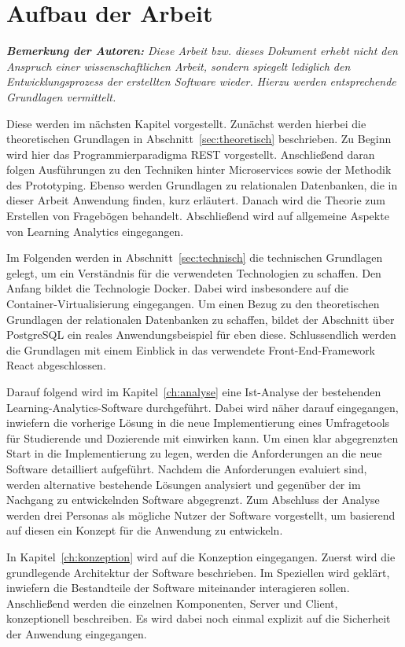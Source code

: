 \section{Aufbau der Arbeit}

\textit{\textbf{Bemerkung der Autoren:}
Diese Arbeit bzw. dieses Dokument erhebt nicht den Anspruch einer wissenschaftlichen Arbeit, sondern spiegelt lediglich den Entwicklungsprozess der erstellten Software wieder.
Hierzu werden entsprechende Grundlagen vermittelt.}

Diese werden im nächsten Kapitel vorgestellt.
Zunächst werden hierbei die theoretischen Grundlagen in Abschnitt~\vref{sec:theoretisch} beschrieben.
Zu Beginn wird hier das Programmierparadigma \acs{REST} vorgestellt.
Anschließend daran folgen Ausführungen zu den Techniken hinter Microservices sowie der Methodik des Prototyping.
Ebenso werden Grundlagen zu relationalen Datenbanken, die in dieser Arbeit Anwendung finden, kurz erläutert.
Danach wird die Theorie zum Erstellen von Fragebögen behandelt.
Abschließend wird auf allgemeine Aspekte von Learning Analytics eingegangen.

Im Folgenden werden in Abschnitt~\vref{sec:technisch} die technischen Grundlagen gelegt, um ein Verständnis für die verwendeten Technologien zu schaffen.
Den Anfang bildet die Technologie Docker.
Dabei wird insbesondere auf die Container-Virtualisierung eingegangen.
Um einen Bezug zu den theoretischen Grundlagen der relationalen Datenbanken zu schaffen, bildet der Abschnitt über PostgreSQL ein reales Anwendungsbeispiel für eben diese.
Schlussendlich werden die Grundlagen mit einem Einblick in das verwendete Front-End-Framework React abgeschlossen.

Darauf folgend wird im Kapitel~\vref{ch:analyse} eine Ist-Analyse der bestehenden Learning-Analytics-Software durchgeführt.
Dabei wird näher darauf eingegangen, inwiefern die vorherige Lösung in die neue Implementierung eines Umfragetools für Studierende und Dozierende mit einwirken kann.
Um einen klar abgegrenzten Start in die Implementierung zu legen, werden die Anforderungen an die neue Software detailliert aufgeführt.
Nachdem die Anforderungen evaluiert sind, werden alternative bestehende Lösungen analysiert und gegenüber der im Nachgang zu entwickelnden Software abgegrenzt.
Zum Abschluss der Analyse werden drei Personas als mögliche Nutzer der Software vorgestellt, um basierend auf diesen ein Konzept für die Anwendung zu entwickeln.

In Kapitel~\vref{ch:konzeption} wird auf die Konzeption eingegangen.
Zuerst wird die grundlegende Architektur der Software beschrieben.
Im Speziellen wird geklärt, inwiefern die Bestandteile der Software miteinander interagieren sollen.
Anschließend werden die einzelnen Komponenten, Server und Client, konzeptionell beschreiben.
Es wird dabei noch einmal explizit auf die Sicherheit der Anwendung eingegangen.

